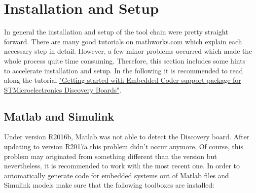 \documentclass[a4paper]{article}
\title{\bf \maintitle\\
  \vspace{1cm}
  {\large
    \subtitle%
  }
}
\author{Nikolas Schroeder\\
  Institute for Systems Theory and Automatic Control\\
  \texttt{lrt86824@stud.uni-stuttgart.de}%
}
\date{\today}
\begin{document}
\maketitle

\hrulefill
\begin{abstract}
This paper gives an overview on how to implement code and sensor interfaces on the STM32F746G Discovery Board using Matlab Embedded Coder and the proper hardware support package. After a short installation and setup guide it is shown how to interface an inertial measurement unit via I2C with the STM-Discovery and monitor the results in Simulink External Mode.

\bigskip

Background: The BNO055 IMU was selected for the IST Self-Driving Bicycle project in order to estimate a measure for the current roll angle $ \phi $ and the corresponding angular rate $ \dot \phi $. 
\end{abstract}

\hrulefill

\pagebreak

\section{Installation and Setup}

In general the installation and setup of the tool chain were pretty straight forward. There are many good tutorials on mathworks.com which explain each necessary step in detail. However, a few minor problems occurred which made the whole process quite time consuming. Therefore, this section includes some hints to accelerate installation and setup. In the following it is recommended to read along the tutorial \href{https://de.mathworks.com/help/supportpkg/stmicroelectronicsstm32f4discovery/examples/getting-started-with-embedded-coder-support-package-for-stmicroelectronics-stm32-discovery-boards.html}{"Getting started with Embedded Coder support package for STMicroelectronics Discovery Boards"}.

\subsection{Matlab and Simulink}

Under version R2016b, Matlab was not able to detect the Discovery board. After updating to version R2017a this problem didn't occur anymore. Of course, this problem may originated from something different than the version but nevertheless, it is recommended to work with the most recent one. In order to automatically generate code for embedded systems out of Matlab files and Simulink models make sure that the following toolboxes are installed:
\end{document}

